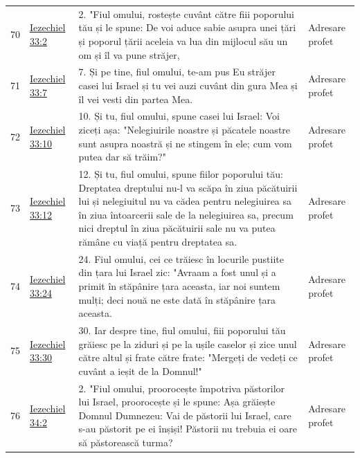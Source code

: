 \documentclass[12pt,a4paper,twoside,openany]{book}
\begin{document}
\begin{longtable}{L{0.8cm}L{1.2cm}L{11.9cm}L{0.8cm}}
70 & \href{https://bibliaortodoxa.ro/carte.php?id=33\&cap=33\#2}{Iezechiel 33:2} & 2. "Fiul omului, rostește cuvânt către fiii poporului tău și le spune: De voi aduce sabie asupra unei țări și poporul țării aceleia va lua din mijlocul său un om și îl va pune străjer, & Adresare profet \\
71 & \href{https://bibliaortodoxa.ro/carte.php?id=33\&cap=33\#7}{Iezechiel 33:7} & 7. Și pe tine, fiul omului, te-am pus Eu străjer casei lui Israel și tu vei auzi cuvânt din gura Mea și îl vei vesti din partea Mea. & Adresare profet \\
72 & \href{https://bibliaortodoxa.ro/carte.php?id=33\&cap=33\#10}{Iezechiel 33:10} & 10. Și tu, fiul omului, spune casei lui Israel: Voi ziceți așa: "Nelegiuirile noastre și păcatele noastre sunt asupra noastră și ne stingem în ele; cum vom putea dar să trăim?" & Adresare profet \\
73 & \href{https://bibliaortodoxa.ro/carte.php?id=33\&cap=33\#12}{Iezechiel 33:12} & 12. Și tu, fiul omului, spune fiilor poporului tău: Dreptatea dreptului nu-l va scăpa în ziua păcătuirii lui și nelegiuitul nu va cădea pentru nelegiuirea sa în ziua întoarcerii sale de la nelegiuirea sa, precum nici dreptul în ziua păcătuirii sale nu va putea rămâne cu viață pentru dreptatea sa. & Adresare profet \\
74 & \href{https://bibliaortodoxa.ro/carte.php?id=33\&cap=33\#24}{Iezechiel 33:24} & 24. Fiul omului, cei ce trăiesc în locurile pustiite din țara lui Israel zic: "Avraam a fost unul și a primit în stăpânire țara aceasta, iar noi suntem mulți; deci nouă ne este dată în stăpânire țara aceasta. & Adresare profet \\
75 & \href{https://bibliaortodoxa.ro/carte.php?id=33\&cap=33\#30}{Iezechiel 33:30} & 30. Iar despre tine, fiul omului, fiii poporului tău grăiesc pe la ziduri și pe la ușile caselor și zice unul către altul și frate către frate: "Mergeți de vedeți ce cuvânt a ieșit de la Domnul!" & Adresare profet \\
76 & \href{https://bibliaortodoxa.ro/carte.php?id=33\&cap=34\#2}{Iezechiel 34:2} & 2. "Fiul omului, proorocește împotriva păstorilor lui Israel, proorocește și le spune: Așa grăiește Domnul Dumnezeu: Vai de păstorii lui Israel, care s-au păstorit pe ei înșiși! Păstorii nu trebuia ei oare să păstorească turma? & Adresare profet \\

\end{longtable}
\end{document}
